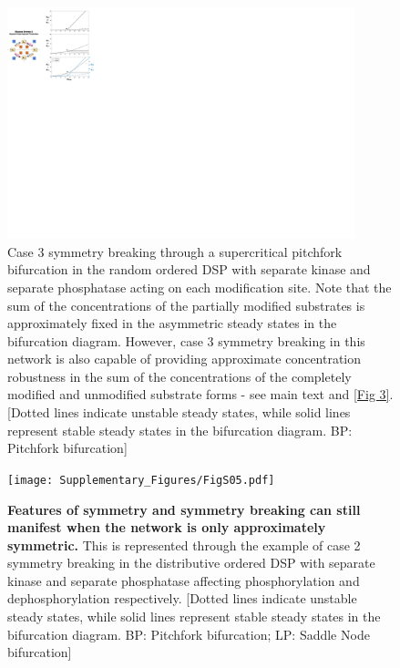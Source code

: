 \documentclass[16pt, a4paper]{article}
\begin{document}
\clearpage
\begin{figure}[ht!]
    \centering
    \includegraphics[width = 0.9\textwidth, keepaspectratio]{FigS04.pdf}
    \caption{Case 3 symmetry breaking through a supercritical pitchfork bifurcation in the random ordered DSP with separate kinase and separate phosphatase acting on each modification site. Note that the sum of the concentrations of the partially modified substrates is approximately fixed in the asymmetric steady states in the bifurcation diagram. However, case 3 symmetry breaking in this network is also capable of providing approximate concentration robustness in the sum of the concentrations of the completely modified and unmodified substrate forms - see main text and \cref{Fig 3}. [Dotted lines indicate unstable steady states, while solid lines represent stable steady states in the bifurcation diagram. BP: Pitchfork bifurcation]}
    \label{Fig S4}
\end{figure}

\clearpage
\begin{figure}[ht!]
    \centering
    \texttt{[image: Supplementary\_Figures/FigS05.pdf]}
    \caption{\textbf{Features of symmetry and symmetry breaking can still manifest when the network is only approximately symmetric.} This is represented through the example of case 2 symmetry breaking in the distributive ordered DSP with separate kinase and separate phosphatase affecting phosphorylation and dephosphorylation respectively. [Dotted lines indicate unstable steady states, while solid lines represent stable steady states in the bifurcation diagram. BP: Pitchfork bifurcation; LP: Saddle Node bifurcation]}
    \label{Fig S5}
\end{figure}
\end{document}
